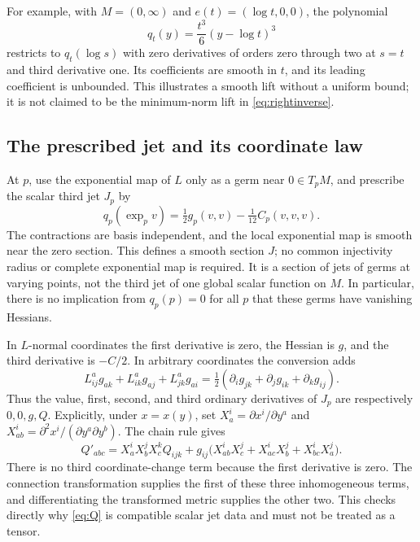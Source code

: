 \documentclass[10pt,letterpaper]{article}
\begin{document}
For example, with $M=(0,\infty)$ and $e(t)=(\log t,0,0)$, the polynomial
\[
 q_t(y)=\frac{t^3}{6}(y-\log t)^3
\]
restricts to $q_t(\log s)$ with zero derivatives of orders zero through two
at $s=t$ and third derivative one. Its coefficients are smooth in $t$,
and its leading coefficient is unbounded. This illustrates a smooth lift
without a uniform bound; it is not claimed to be the minimum-norm lift
in \eqref{eq:rightinverse}.

\subsection*{The prescribed jet and its coordinate law}

At $p$, use the exponential map of $L$ only as a germ near $0\in T_pM$,
and prescribe the scalar third jet $J_p$ by
\begin{equation}\label{eq:germ}
 q_p(\exp_p v)=\tfrac12 g_p(v,v)-\tfrac1{12}C_p(v,v,v).
\end{equation}
The contractions are basis independent, and the local exponential map is
smooth near the zero section. This defines a smooth section $J$; no common
injectivity radius or complete exponential map is required. It is a section
of jets of germs at varying points, not the third jet of one global scalar
function on $M$. In particular, there is no implication from $q_p(p)=0$
for all $p$ that these germs have vanishing Hessians.

In $L$-normal coordinates the first derivative is zero, the Hessian is $g$,
and the third derivative is $-C/2$. In arbitrary coordinates the conversion
adds
\[
 L_{ij}^{a}g_{ak}+L_{ik}^{a}g_{aj}+L_{jk}^{a}g_{ai}
 =\tfrac12(\partial_i g_{jk}+\partial_j g_{ik}+\partial_k g_{ij}).
\]
Thus the value, first, second, and third ordinary derivatives of $J_p$ are
respectively $0,0,g,Q$. Explicitly, under $x=x(y)$, set
$X_a^i=\partial x^i/\partial y^a$ and
$X_{ab}^i=\partial^2x^i/(\partial y^a\partial y^b)$. The chain rule gives
\begin{equation}\label{eq:chartlaw}
 Q'_{abc}=X_a^iX_b^jX_c^k Q_{ijk}
 +g_{ij}\bigl(X_{ab}^iX_c^j+X_{ac}^iX_b^j+X_{bc}^iX_a^j\bigr).
\end{equation}
There is no third coordinate-change term because the first derivative is
zero. The connection transformation supplies the first of these three
inhomogeneous terms, and differentiating the transformed metric supplies
the other two. This checks directly why \eqref{eq:Q} is compatible scalar
jet data and must not be treated as a tensor.
\end{document}
